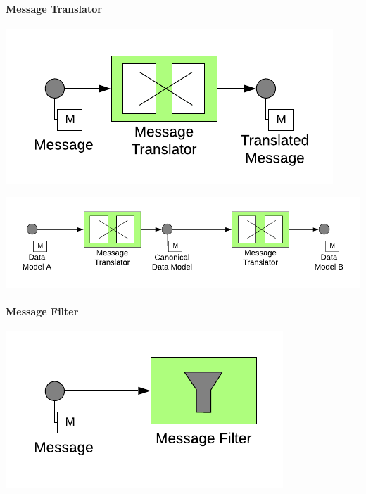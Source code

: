 \paragraph{Message Translator}

\begin{center}
    \includegraphics[scale=0.6]{Diagrams/Messaging/6. Message Translator.pdf}
\end{center}

\begin{center}
    \includegraphics[scale=0.6]{Diagrams/Messaging/7. Message Translator.pdf}
\end{center}

\paragraph{Message Filter}

\begin{center}
    \includegraphics[scale=0.6]{Diagrams/Messaging/8. Message Filter.pdf}
\end{center}

